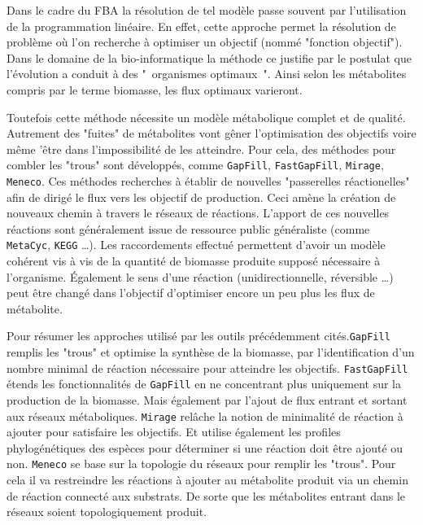 \begin{refsegment}
    
    Dans le cadre du \gls{FBA} la résolution de tel modèle passe souvent par l'utilisation de la programmation linéaire. En effet, cette approche permet la résolution de problème où l'on recherche à optimiser un objectif (nommé "fonction objectif"). Dans le domaine de la bio-informatique la méthode ce justifie par le postulat  que l’évolution a conduit à des " organismes optimaux ". Ainsi selon les métabolites compris par le terme biomasse, les flux optimaux varieront.
    
    Toutefois cette méthode nécessite un modèle métabolique complet et de qualité. Autrement des "fuites" de métabolites vont gêner l'optimisation des objectifs voire même 'être dans l'impossibilité de les atteindre. Pour cela, des méthodes pour combler les "trous" sont développés, comme \texttt{GapFill}\cite{kumar2007optimization}, \texttt{FastGapFill}\cite{thiele2014fastgapfill}, \texttt{Mirage}\cite{vitkin2012mirage}, \texttt{Meneco}\cite{prigent2017meneco}. Ces méthodes recherches à établir de nouvelles "passerelles réactionelles" afin de dirigé le flux vers les objectif de production. Ceci amène la création de nouveaux chemin à travers le réseaux de réactions. L'apport de ces nouvelles réactions sont généralement issue de ressource public généraliste (comme \texttt{MetaCyc}, \texttt{\gls{KEGG}} \ldots). Les raccordements effectué permettent d'avoir un modèle cohérent vis à vis de la quantité de biomasse produite supposé nécessaire à l'organisme. Également le sens d'une réaction (unidirectionnelle, réversible \ldots) peut être changé dans l'objectif d'optimiser encore un peu plus les flux de métabolite.
    
    Pour résumer les approches utilisé par les outils précédemment cités.\texttt{GapFill} remplis les "trous" et optimise la synthèse de la biomasse, par l'identification d'un nombre minimal de réaction nécessaire pour atteindre les objectifs. \texttt{FastGapFill} étends les fonctionnalités de \texttt{GapFill} en ne concentrant plus uniquement sur la production de la biomasse. Mais également par l'ajout de flux entrant et sortant aux réseaux métaboliques. \texttt{Mirage} relâche la notion de minimalité de réaction à ajouter pour satisfaire les objectifs. Et utilise également les profiles phylogénétiques des espèces pour déterminer si une réaction doit être ajouté ou non. \texttt{Meneco} se base sur la topologie du réseaux pour remplir les "trous". Pour cela il va restreindre les réactions à ajouter au métabolite produit via un chemin de réaction connecté aux substrats. De sorte que les métabolites entrant dans le réseaux soient topologiquement produit.
    

\end{refsegment}
